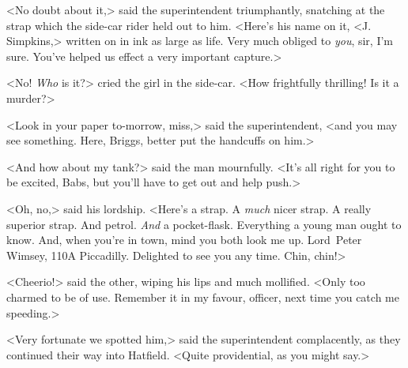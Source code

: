 <No doubt about it,> said the superintendent triumphantly, snatching at the strap which the side-car rider held out to him. <Here's his name on it, <J\@. Simpkins,> written on in ink as large as life. Very much obliged to \emph{you}, sir, I'm sure. You've helped us effect a very important capture.>

<No! \emph{Who} is it?> cried the girl in the side-car. <How frightfully thrilling! Is it a murder?>

<Look in your paper to-morrow, miss,> said the superintendent, <and you may see something. Here, Briggs, better put the handcuffs on him.>

<And how about my tank?> said the man mournfully. <It's all right for you to be excited, Babs, but you'll have to get out and help push.>

<Oh, no,> said his lordship. <Here's a strap. A \emph{much} nicer strap. A really superior strap. And petrol. \emph{And} a pocket-flask. Everything a young man ought to know. And, when you're in town, mind you both look me up. Lord~Peter Wimsey, 110A Piccadilly. Delighted to see you any time. Chin, chin!>

<Cheerio!> said the other, wiping his lips and much mollified. <Only too charmed to be of use. Remember it in my favour, officer, next time you catch me speeding.>

<Very fortunate we spotted him,> said the superintendent complacently, as they continued their way into Hatfield. <Quite providential, as you might say.>

